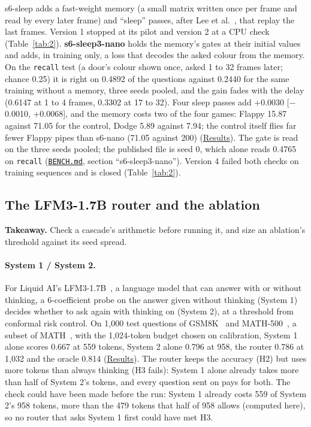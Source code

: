 \documentclass[10pt]{article}
\begin{document}
s6-sleep adds a fast-weight memory (a small matrix written once per frame and read by every later frame) and ``sleep'' passes, after Lee et al.~\cite{lee2026sleep}, that replay the last frames. Version 1 stopped at its pilot and version 2 at a CPU check (Table~\ref{tab:2}). \textbf{s6-sleep3-nano} holds the memory's gates at their initial values and adds, in training only, a loss that decodes the asked colour from the memory. On the \texttt{recall} test (a door's colour shown once, asked 1 to 32 frames later; chance 0.25) it is right on 0.4892 of the questions against 0.2440 for the same training without a memory, three seeds pooled, and the gain fades with the delay (0.6147 at 1 to 4 frames, 0.3302 at 17 to 32). Four sleep passes add +0.0030 [$-$0.0010, +0.0068], and the memory costs two of the four games: Flappy 15.87 against 71.05 for the control, Dodge 5.89 against 7.94; the control itself flies far fewer Flappy pipes than s6-nano (71.05 against 200) (\href{https://maxgfr.github.io/skycmd/results/\#s6-sleep3-nano-failed}{Results}). The gate is read on the three seeds pooled; the published file is seed 0, which alone reads 0.4765 on \texttt{recall} (\href{https://github.com/maxgfr/skycmd/blob/main/BENCH.md}{\texttt{BENCH.md}}, section ``s6-sleep3-nano''). Version 4 failed both checks on training sequences and is closed (Table~\ref{tab:2}).

\subsection{The LFM3-1.7B router and the ablation}\label{sec:6.7}

\textbf{Takeaway.} Check a cascade's arithmetic before running it, and size an ablation's threshold against its seed spread.

\paragraph{System 1 / System 2.} For Liquid AI's LFM3-1.7B~\cite{lfm3}, a language model that can answer with or without thinking, a 6-coefficient probe on the answer given without thinking (System 1) decides whether to ask again with thinking on (System 2), at a threshold from conformal risk control. On 1,000 test questions of GSM8K~\cite{cobbe2021gsm8k} and MATH-500~\cite{lightman2024verify}, a subset of MATH~\cite{hendrycks2021math}, with the 1,024-token budget chosen on calibration, System 1 alone scores 0.667 at 559 tokens, System 2 alone 0.796 at 958, the router 0.786 at 1,032 and the oracle 0.814 (\href{https://maxgfr.github.io/skycmd/results/\#lfm3-s1s2}{Results}). The router keeps the accuracy (H2) but uses more tokens than always thinking (H3 fails): System 1 alone already takes more than half of System 2's tokens, and every question sent on pays for both. The check could have been made before the run: System 1 already costs 559 of System 2's 958 tokens, more than the 479 tokens that half of 958 allows (computed here), so no router that asks System 1 first could have met H3.
\end{document}
